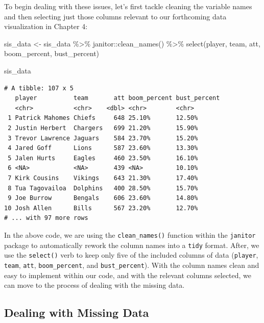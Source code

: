 \documentclass[
  letterpaper,
]{krantz}
\newenvironment{Shaded}{\begin{snugshade}}{\end{snugshade}}
\newcommand{\FunctionTok}[1]{\textcolor[rgb]{0.28,0.35,0.67}{#1}}
\newcommand{\NormalTok}[1]{\textcolor[rgb]{0.00,0.23,0.31}{#1}}
\newcommand{\OtherTok}[1]{\textcolor[rgb]{0.00,0.23,0.31}{#1}}
\newcommand{\SpecialCharTok}[1]{\textcolor[rgb]{0.37,0.37,0.37}{#1}}
\begin{document}
To begin dealing with these issues, let's first tackle cleaning the
variable names and then selecting just those columns relevant to our
forthcoming data visualization in Chapter 4:

\begin{Shaded}
\begin{Highlighting}[]
\NormalTok{sis\_data }\OtherTok{\textless{}{-}}\NormalTok{ sis\_data }\SpecialCharTok{\%\textgreater{}\%}
\NormalTok{  janitor}\SpecialCharTok{::}\FunctionTok{clean\_names}\NormalTok{() }\SpecialCharTok{\%\textgreater{}\%}
  \FunctionTok{select}\NormalTok{(player, team, att, boom\_percent, bust\_percent)}

\NormalTok{sis\_data}
\end{Highlighting}
\end{Shaded}

\begin{verbatim}
# A tibble: 107 x 5
   player          team       att boom_percent bust_percent
   <chr>           <chr>    <dbl> <chr>        <chr>       
 1 Patrick Mahomes Chiefs     648 25.10%       12.50%      
 2 Justin Herbert  Chargers   699 21.20%       15.90%      
 3 Trevor Lawrence Jaguars    584 23.70%       15.20%      
 4 Jared Goff      Lions      587 23.60%       13.30%      
 5 Jalen Hurts     Eagles     460 23.50%       16.10%      
 6 <NA>            <NA>       439 <NA>         10.10%      
 7 Kirk Cousins    Vikings    643 21.30%       17.40%      
 8 Tua Tagovailoa  Dolphins   400 28.50%       15.70%      
 9 Joe Burrow      Bengals    606 23.60%       14.80%      
10 Josh Allen      Bills      567 23.20%       12.70%      
# ... with 97 more rows
\end{verbatim}

In the above code, we are using the \texttt{clean\_names()} function
within the \texttt{janitor} package to automatically rework the column
names into a \texttt{tidy} format. After, we use the \texttt{select()}
verb to keep only five of the included columns of data (\texttt{player},
\texttt{team}, \texttt{att}, \texttt{boom\_percent}, and
\texttt{bust\_percent}). With the column names clean and easy to
implement within our code, and with the relevant columns selected, we
can move to the process of dealing with the missing data.

\hypertarget{dealing-with-missing-data}{%
\subsection{Dealing with Missing Data}\label{dealing-with-missing-data}}
\end{document}
